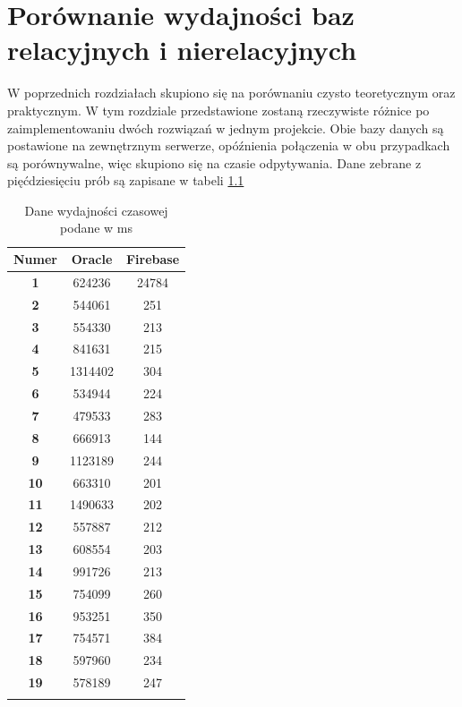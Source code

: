 \chapter{Porównanie wydajności baz relacyjnych i nierelacyjnych}

W poprzednich rozdziałach skupiono się na porównaniu czysto teoretycznym oraz praktycznym. W tym rozdziale przedstawione zostaną rzeczywiste różnice po zaimplementowaniu dwóch rozwiązań w jednym projekcie. Obie bazy danych są postawione na zewnętrznym serwerze, opóźnienia połączenia w obu przypadkach są porównywalne, więc skupiono się na czasie odpytywania. Dane zebrane z pięćdziesięciu prób są zapisane w tabeli \ref{tabelaDanych}

\begin{table}[!ht]
\centering
\caption{Dane wydajności czasowej podane w ms}
\label{tabelaDanych}
\begin{tabular}{|c|c|c|}
\hline
\textbf{Numer} & \textbf{Oracle} & \textbf{Firebase} \\ \hline
\textbf{1}  & 624236 & 24784 \\ \hline \rowcolor{Gray}
\textbf{2}  & 544061 & 251 \\ \hline
\textbf{3}  & 554330 & 213 \\ \hline \rowcolor{Gray}
\textbf{4}  & 841631 & 215 \\ \hline
\textbf{5}  & 1314402 & 304 \\ \hline \rowcolor{Gray}
\textbf{6}  & 534944 & 224 \\ \hline
\textbf{7}  & 479533 & 283 \\ \hline \rowcolor{Gray}
\textbf{8}  & 666913 & 144 \\ \hline
\textbf{9}  & 1123189 & 244 \\ \hline \rowcolor{Gray}
\textbf{10} & 663310 & 201 \\ \hline
\textbf{11} & 1490633 & 202 \\ \hline \rowcolor{Gray}
\textbf{12} & 557887 & 212 \\ \hline
\textbf{13} & 608554 & 203 \\ \hline \rowcolor{Gray}
\textbf{14} & 991726 & 213 \\ \hline
\textbf{15} & 754099 & 260 \\ \hline \rowcolor{Gray}
\textbf{16} & 953251 & 350 \\ \hline
\textbf{17} & 754571 & 384 \\ \hline \rowcolor{Gray}
\textbf{18} & 597960 & 234 \\ \hline
\textbf{19} & 578189 & 247 \\ \hline \rowcolor{Gray}

\end{tabular}
\end{table}
